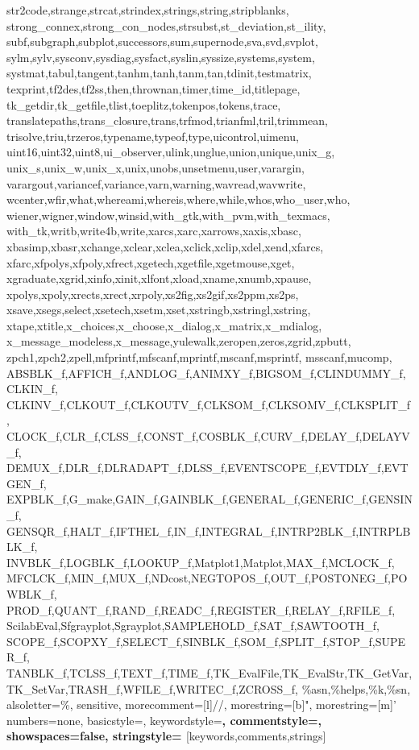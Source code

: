 {{      str2code,strange,strcat,strindex,strings,string,stripblanks,%
      strong_connex,strong_con_nodes,strsubst,st_deviation,st_ility,%
      subf,subgraph,subplot,successors,sum,supernode,sva,svd,svplot,%
      sylm,sylv,sysconv,sysdiag,sysfact,syslin,syssize,systems,system,%
      systmat,tabul,tangent,tanhm,tanh,tanm,tan,tdinit,testmatrix,%
      texprint,tf2des,tf2ss,then,thrownan,timer,time_id,titlepage,%
      tk_getdir,tk_getfile,tlist,toeplitz,tokenpos,tokens,trace,%
      translatepaths,trans_closure,trans,trfmod,trianfml,tril,trimmean,%
      trisolve,triu,trzeros,typename,typeof,type,uicontrol,uimenu,%
      uint16,uint32,uint8,ui_observer,ulink,unglue,union,unique,unix_g,%
      unix_s,unix_w,unix_x,unix,unobs,unsetmenu,user,varargin,%
      varargout,variancef,variance,varn,warning,wavread,wavwrite,%
      wcenter,wfir,what,whereami,whereis,where,while,whos,who_user,who,%
      wiener,wigner,window,winsid,with_gtk,with_pvm,with_texmacs,%
      with_tk,writb,write4b,write,xarcs,xarc,xarrows,xaxis,xbasc,%
      xbasimp,xbasr,xchange,xclear,xclea,xclick,xclip,xdel,xend,xfarcs,%
      xfarc,xfpolys,xfpoly,xfrect,xgetech,xgetfile,xgetmouse,xget,%
      xgraduate,xgrid,xinfo,xinit,xlfont,xload,xname,xnumb,xpause,%
      xpolys,xpoly,xrects,xrect,xrpoly,xs2fig,xs2gif,xs2ppm,xs2ps,%
      xsave,xsegs,select,xsetech,xsetm,xset,xstringb,xstringl,xstring,%
      xtape,xtitle,x_choices,x_choose,x_dialog,x_matrix,x_mdialog,%
      x_message_modeless,x_message,yulewalk,zeropen,zeros,zgrid,zpbutt,%
      zpch1,zpch2,zpell,mfprintf,mfscanf,mprintf,mscanf,msprintf,%
      msscanf,mucomp,%
      ABSBLK_f,AFFICH_f,ANDLOG_f,ANIMXY_f,BIGSOM_f,CLINDUMMY_f,CLKIN_f,%
      CLKINV_f,CLKOUT_f,CLKOUTV_f,CLKSOM_f,CLKSOMV_f,CLKSPLIT_f,%
      CLOCK_f,CLR_f,CLSS_f,CONST_f,COSBLK_f,CURV_f,DELAY_f,DELAYV_f,%
      DEMUX_f,DLR_f,DLRADAPT_f,DLSS_f,EVENTSCOPE_f,EVTDLY_f,EVTGEN_f,%
      EXPBLK_f,G_make,GAIN_f,GAINBLK_f,GENERAL_f,GENERIC_f,GENSIN_f,%
      GENSQR_f,HALT_f,IFTHEL_f,IN_f,INTEGRAL_f,INTRP2BLK_f,INTRPLBLK_f,%
      INVBLK_f,LOGBLK_f,LOOKUP_f,Matplot1,Matplot,MAX_f,MCLOCK_f,%
      MFCLCK_f,MIN_f,MUX_f,NDcost,NEGTOPOS_f,OUT_f,POSTONEG_f,POWBLK_f,%
      PROD_f,QUANT_f,RAND_f,READC_f,REGISTER_f,RELAY_f,RFILE_f,%
      ScilabEval,Sfgrayplot,Sgrayplot,SAMPLEHOLD_f,SAT_f,SAWTOOTH_f,%
      SCOPE_f,SCOPXY_f,SELECT_f,SINBLK_f,SOM_f,SPLIT_f,STOP_f,SUPER_f,%
      TANBLK_f,TCLSS_f,TEXT_f,TIME_f,TK_EvalFile,TK_EvalStr,TK_GetVar,%
      TK_SetVar,TRASH_f,WFILE_f,WRITEC_f,ZCROSS_f,%
      \%asn,\%helps,\%k,\%sn},%
   alsoletter=\%,%
   sensitive,%
   morecomment=[l]//,%
   morestring=[b]",%
   morestring=[m]'%
   numbers=none,%
   basicstyle=\tiny,%
   keywordstyle=\bfseries,%
   commentstyle=\bfseries,%
   showspaces=false,%
   stringstyle=\bfseries
  }[keywords,comments,strings]%

\usepackage{algorithmic}

\usepackage{url}

\newcommand{\RR}{\mathbb{R}}
\newcommand{\CC}{\mathbb{C}}




